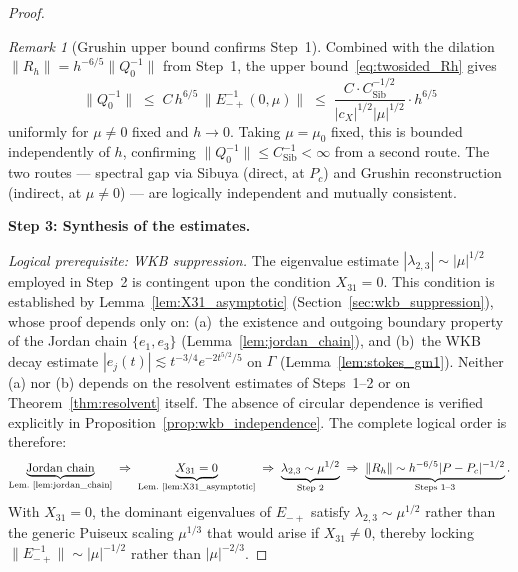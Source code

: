 \documentclass[12pt,a4paper]{amsart}
\theoremstyle{remark}
\newtheorem{remark}[theorem]{Remark}
\begin{document}
\begin{proof}
\begin{remark}[Grushin upper bound confirms Step~1]
\label{rem:grushin_upper_confirms}
Combined with the dilation $\|R_h\| = h^{-6/5}\|Q_0^{-1}\|$ from Step~1,
the upper bound~\eqref{eq:twosided_Rh} gives
\[
  \|Q_0^{-1}\| \;\leq\; C\,h^{6/5}\,\|E_{-+}^{-1}(0,\mu)\|
  \;\leq\; \frac{C\cdot C_{\mathrm{Sib}}^{-1/2}}{|c_X|^{1/2}|\mu|^{1/2}}\cdot h^{6/5}
\]
uniformly for $\mu \neq 0$ fixed and $h \to 0$.
Taking $\mu = \mu_0$ fixed, this is bounded independently of $h$, confirming
$\|Q_0^{-1}\| \leq C_{\mathrm{Sib}}^{-1} < \infty$ from a second route.
The two routes — spectral gap via Sibuya (direct, at $P_c$) and Grushin
reconstruction (indirect, at $\mu \neq 0$) — are logically independent
and mutually consistent.
\end{remark}
\textbf{Step 3: Synthesis of the estimates.}

\emph{Logical prerequisite: WKB suppression.}
The eigenvalue estimate $|\lambda_{2,3}|\sim|\mu|^{1/2}$ employed in Step~2 is
contingent upon the condition $X_{31}=0$.
This condition is established by Lemma~\ref{lem:X31_asymptotic}
(Section~\ref{sec:wkb_suppression}), whose proof depends only on:
(a)~the existence and outgoing boundary property of the Jordan chain $\{e_1,e_3\}$
(Lemma~\ref{lem:jordan_chain}), and
(b)~the WKB decay estimate $|e_j(t)|\lesssim t^{-3/4}e^{-2t^{5/2}/5}$
on $\Gamma$ (Lemma~\ref{lem:stokes_gm1}).
Neither (a) nor (b) depends on the resolvent estimates of Steps~1--2 or on
Theorem~\ref{thm:resolvent} itself.
The absence of circular dependence is verified explicitly in
Proposition~\ref{prop:wkb_independence}.
The complete logical order is therefore:
\begin{gather*}
  \underbrace{\text{Jordan chain}}_{\text{Lem.~\ref{lem:jordan_chain}}}
  \;\Rightarrow\;
  \underbrace{X_{31}=0}_{\text{Lem.~\ref{lem:X31_asymptotic}}}
  \;\Rightarrow\;
  \underbrace{\lambda_{2,3}\sim\mu^{1/2}}_{\text{Step~2}}
  \;\Rightarrow\;
  \underbrace{\|R_h\|\sim h^{-6/5}|P-P_c|^{-1/2}}_{\text{Steps~1--3}}.
\end{gather*}
With $X_{31}=0$, the dominant eigenvalues of $E_{-+}$ satisfy
$\lambda_{2,3} \sim \mu^{1/2}$ rather than the generic Puiseux scaling
$\mu^{1/3}$ that would arise if $X_{31}\neq 0$, thereby locking
$\|E_{-+}^{-1}\| \sim |\mu|^{-1/2}$ rather than $|\mu|^{-2/3}$.


\end{proof}
\end{document}
